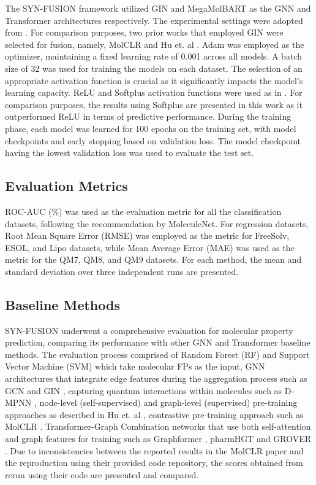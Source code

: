 \documentclass[sigconf,nonacm]{acmart}
\begin{document}
The SYN-FUSION framework utilized GIN and MegaMolBART as the GNN and Transformer architectures respectively. The experimental settings were adopted from \cite{Wang_2022}. For comparison purposes, two prior works that employed GIN were selected for fusion, namely, MolCLR \cite{Wang_2022} 
and Hu et. al \cite{DBLP:conf/iclr/HuLGZLPL20}. 
Adam was employed as the optimizer, maintaining a fixed learning rate of 0.001 across all models. A batch size of 32 was used for training the models on each dataset. The selection of an appropriate activation function is crucial as it significantly impacts the model's learning capacity. ReLU 
and Softplus 
activation functions were used as in \cite{Wang_2022}. For comparison purposes, the results using Softplus are presented in this work as it outperformed ReLU in terms of predictive performance. During the training phase, each model was learned for 100 epochs on the training set, with model checkpoints and early stopping based on validation loss. The model checkpoint having the lowest validation loss was used to evaluate the test set.

\subsection{Evaluation Metrics}


 ROC-AUC (\%) was used as the evaluation metric for all the classification datasets, following the recommendation by MoleculeNet. For regression datasets, Root Mean Square Error (RMSE) was employed as the metric for FreeSolv, ESOL, and Lipo datasets, while Mean Average Error (MAE) was used as the metric for the QM7, QM8, and QM9 datasets. For each method, the mean and standard deviation over three independent runs are presented.

\subsection{Baseline Methods}






SYN-FUSION underwent a comprehensive evaluation for molecular property prediction, comparing its performance with other GNN and Transformer baseline methods.
The evaluation process comprised of Random Forest (RF) and Support Vector Machine (SVM) which take molecular FPs as the input, GNN architectures that integrate edge features during the aggregation process such as GCN \cite{DBLP:conf/iclr/KipfW17} and GIN \cite{DBLP:conf/iclr/XuHLJ19}, capturing quantum interactions within molecules such as D-MPNN \cite{doi:10.1021/acs.jcim.9b00237}, node-level (self-supervised) and graph-level (supervised) pre-training approaches as described in Hu et. al \cite{DBLP:conf/iclr/HuLGZLPL20}, contrastive pre-training approach such as MolCLR \cite{Wang_2022}. Transformer-Graph Combination networks that use both self-attention and graph features for training such as Graphformer \cite{ying2021do}, pharmHGT \cite{Jiang2023} and GROVER \cite{DBLP:conf/nips/RongBXX0HH20}.
Due to inconsistencies between the reported results in the MolCLR paper and the reproduction using their provided code repository, the scores obtained from rerun using their code are presented and compared.
\end{document}
